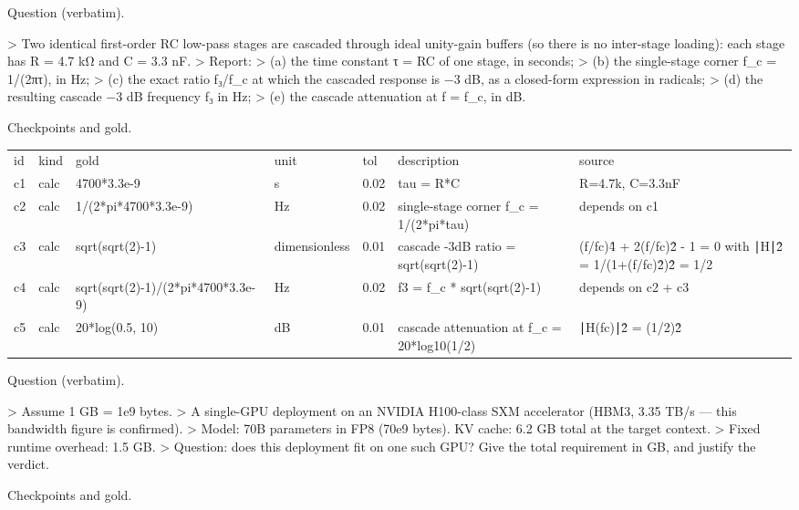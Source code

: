 \documentclass[10pt,twocolumn]{article}
\begin{document}
Question (verbatim).


> Two identical first-order RC low-pass stages are cascaded through ideal unity-gain buffers (so there is no inter-stage loading): each stage has R = 4.7 kΩ and C = 3.3 nF. > Report: > (a) the time constant τ = RC of one stage, in seconds; > (b) the single-stage corner f\_c = 1/(2πτ), in Hz; > (c) the exact ratio f₃/f\_c at which the cascaded response is −3 dB, as a closed-form expression in radicals; > (d) the resulting cascade −3 dB frequency f₃ in Hz; > (e) the cascade attenuation at f = f\_c, in dB.


Checkpoints and gold.


\begin{table}[h]
\centering
\begin{tabular}{lllllll}
id & kind & gold & unit & tol & description & source \\
c1 & calc & 4700*3.3e-9 & s & 0.02 & tau = R*C & R=4.7k, C=3.3nF \\
c2 & calc & 1/(2*pi*4700*3.3e-9) & Hz & 0.02 & single-stage corner f\_c = 1/(2*pi*tau) & depends on c1 \\
c3 & calc & sqrt(sqrt(2)-1) & dimensionless & 0.01 & cascade -3dB ratio = sqrt(sqrt(2)-1) & (f/fc)\^4 + 2(f/fc)\^2 - 1 = 0 with ∣H∣\^2 = 1/(1+(f/fc)\^2)\^2 = 1/2 \\
c4 & calc & sqrt(sqrt(2)-1)/(2*pi*4700*3.3e-9) & Hz & 0.02 & f3 = f\_c * sqrt(sqrt(2)-1) & depends on c2 + c3 \\
c5 & calc & 20*log(0.5, 10) & dB & 0.01 & cascade attenuation at f\_c = 20*log10(1/2) & ∣H(fc)∣\^2 = (1/2)\^2
\end{tabular}
\end{table}


Question (verbatim).


> Assume 1 GB = 1e9 bytes. > A single-GPU deployment on an NVIDIA H100-class SXM accelerator (HBM3, 3.35 TB/s — this bandwidth figure is confirmed). > Model: 70B parameters in FP8 (70e9 bytes). KV cache: 6.2 GB total at the target context. > Fixed runtime overhead: 1.5 GB. > Question: does this deployment fit on one such GPU? Give the total requirement in GB, and justify the verdict.


Checkpoints and gold.
\end{document}
